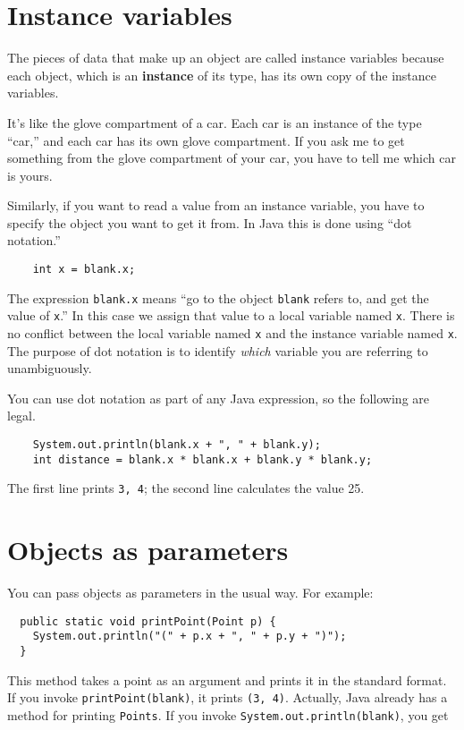 \documentclass[12pt]{book}
\theoremstyle{definition}
\begin{document}
\section{Instance variables}

The pieces of data that make up an object are called instance
variables because each object, which is an {\bf instance} of its
type, has its own copy of the instance variables.

It's like the glove compartment of a car.  Each car is an instance
of the type ``car,'' and each car has its own glove compartment.  If
you ask me to get something from the glove compartment of your car,
you have to tell me which car is yours.


Similarly, if you want to read a value from an instance variable, you
have to specify the object you want to get it from.  In Java this is
done using ``dot notation.''

\begin{lstlisting}
    int x = blank.x;
\end{lstlisting}
%
The expression {\tt blank.x} means ``go to the object {\tt blank}
refers to, and get the value of {\tt x}.''  In this case we assign
that value to a local variable named {\tt x}.  There is no
conflict between the local variable named {\tt x} and the instance
variable named {\tt x}.  The purpose of dot notation is to identify
{\em which} variable you are referring to unambiguously.

You can use dot notation as part of any Java expression, so the
following are legal.

\begin{lstlisting}
    System.out.println(blank.x + ", " + blank.y);
    int distance = blank.x * blank.x + blank.y * blank.y;
\end{lstlisting}
%
The first line prints {\tt 3, 4}; the second line calculates
the value 25.

\section{Objects as parameters}

You can pass objects as parameters in the usual way.  For
example:

\begin{lstlisting}
  public static void printPoint(Point p) {
    System.out.println("(" + p.x + ", " + p.y + ")");
  }
\end{lstlisting}
%
This method takes a point as an argument and prints it in
the standard format.  If you invoke {\tt printPoint(blank)},
it prints {\tt(3, 4)}.  Actually, Java already has a
method for printing {\tt Points}.  If you invoke
{\tt System.out.println(blank)}, you get
\end{document}
